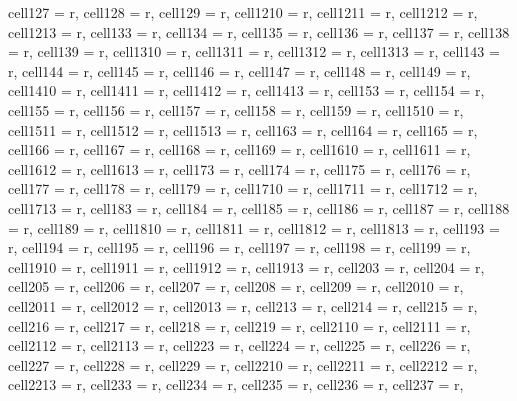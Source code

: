 \documentclass[journal]{IEEEtran}
\begin{document}
\begin{table}
\begin{adjustbox}{width=\textwidth}
\begin{tblr}
{  cell{12}{7} = {r},
  cell{12}{8} = {r},
  cell{12}{9} = {r},
  cell{12}{10} = {r},
  cell{12}{11} = {r},
  cell{12}{12} = {r},
  cell{12}{13} = {r},
  cell{13}{3} = {r},
  cell{13}{4} = {r},
  cell{13}{5} = {r},
  cell{13}{6} = {r},
  cell{13}{7} = {r},
  cell{13}{8} = {r},
  cell{13}{9} = {r},
  cell{13}{10} = {r},
  cell{13}{11} = {r},
  cell{13}{12} = {r},
  cell{13}{13} = {r},
  cell{14}{3} = {r},
  cell{14}{4} = {r},
  cell{14}{5} = {r},
  cell{14}{6} = {r},
  cell{14}{7} = {r},
  cell{14}{8} = {r},
  cell{14}{9} = {r},
  cell{14}{10} = {r},
  cell{14}{11} = {r},
  cell{14}{12} = {r},
  cell{14}{13} = {r},
  cell{15}{3} = {r},
  cell{15}{4} = {r},
  cell{15}{5} = {r},
  cell{15}{6} = {r},
  cell{15}{7} = {r},
  cell{15}{8} = {r},
  cell{15}{9} = {r},
  cell{15}{10} = {r},
  cell{15}{11} = {r},
  cell{15}{12} = {r},
  cell{15}{13} = {r},
  cell{16}{3} = {r},
  cell{16}{4} = {r},
  cell{16}{5} = {r},
  cell{16}{6} = {r},
  cell{16}{7} = {r},
  cell{16}{8} = {r},
  cell{16}{9} = {r},
  cell{16}{10} = {r},
  cell{16}{11} = {r},
  cell{16}{12} = {r},
  cell{16}{13} = {r},
  cell{17}{3} = {r},
  cell{17}{4} = {r},
  cell{17}{5} = {r},
  cell{17}{6} = {r},
  cell{17}{7} = {r},
  cell{17}{8} = {r},
  cell{17}{9} = {r},
  cell{17}{10} = {r},
  cell{17}{11} = {r},
  cell{17}{12} = {r},
  cell{17}{13} = {r},
  cell{18}{3} = {r},
  cell{18}{4} = {r},
  cell{18}{5} = {r},
  cell{18}{6} = {r},
  cell{18}{7} = {r},
  cell{18}{8} = {r},
  cell{18}{9} = {r},
  cell{18}{10} = {r},
  cell{18}{11} = {r},
  cell{18}{12} = {r},
  cell{18}{13} = {r},
  cell{19}{3} = {r},
  cell{19}{4} = {r},
  cell{19}{5} = {r},
  cell{19}{6} = {r},
  cell{19}{7} = {r},
  cell{19}{8} = {r},
  cell{19}{9} = {r},
  cell{19}{10} = {r},
  cell{19}{11} = {r},
  cell{19}{12} = {r},
  cell{19}{13} = {r},
  cell{20}{3} = {r},
  cell{20}{4} = {r},
  cell{20}{5} = {r},
  cell{20}{6} = {r},
  cell{20}{7} = {r},
  cell{20}{8} = {r},
  cell{20}{9} = {r},
  cell{20}{10} = {r},
  cell{20}{11} = {r},
  cell{20}{12} = {r},
  cell{20}{13} = {r},
  cell{21}{3} = {r},
  cell{21}{4} = {r},
  cell{21}{5} = {r},
  cell{21}{6} = {r},
  cell{21}{7} = {r},
  cell{21}{8} = {r},
  cell{21}{9} = {r},
  cell{21}{10} = {r},
  cell{21}{11} = {r},
  cell{21}{12} = {r},
  cell{21}{13} = {r},
  cell{22}{3} = {r},
  cell{22}{4} = {r},
  cell{22}{5} = {r},
  cell{22}{6} = {r},
  cell{22}{7} = {r},
  cell{22}{8} = {r},
  cell{22}{9} = {r},
  cell{22}{10} = {r},
  cell{22}{11} = {r},
  cell{22}{12} = {r},
  cell{22}{13} = {r},
  cell{23}{3} = {r},
  cell{23}{4} = {r},
  cell{23}{5} = {r},
  cell{23}{6} = {r},
  cell{23}{7} = {r},
}
\end{tblr}
\end{adjustbox}
\end{table}
\end{document}
